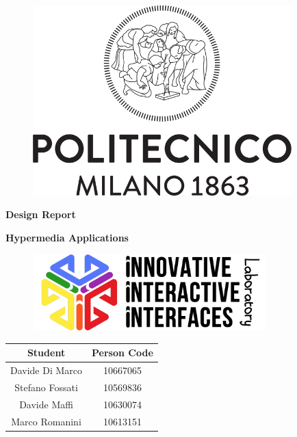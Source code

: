 \documentclass[11pt, letterpaper]{article}
\begin{document}
    \begin{titlepage}
        \begin{center}
        \vspace*{1cm}
            \begin{figure}
                \centering
                \includegraphics[width=10cm]{images/logos/Logo_Politecnico_Milano.png}
            \end{figure}
            
            \huge
            \textbf{Design Report}

            \vspace{1cm}
        
            \Large
            \textbf{Hypermedia Applications}

            \vspace{1.5cm}

            \begin{figure}[H]
                \centering
                \includegraphics[width=9cm]{images/logos/i3lab.png}
            \end{figure}

            \vspace{2cm}

            \begin{tabular}{c|c}
                Student & Person Code\\
                \hline\hline
                Davide Di Marco & 10667065\\
                Stefano Fossati & 10569836\\
                Davide Maffi & 10630074\\
                Marco Romanini & 10613151
            \end{tabular}
            \large
            
        \end{center}
    \end{titlepage}
\end{document}
